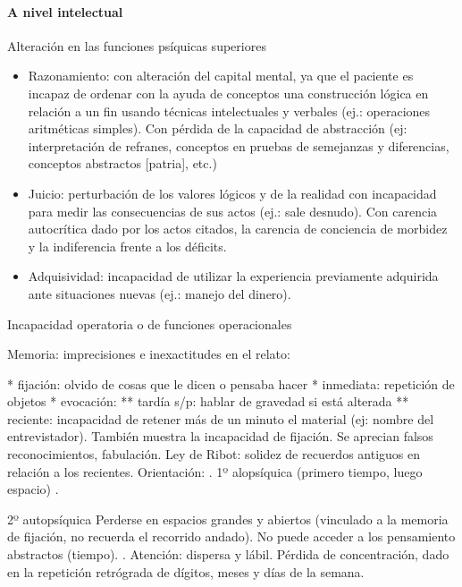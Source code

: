 \paragraph{A nivel intelectual}
Alteración en las funciones psíquicas superiores
\begin{itemize}
	\item Razonamiento: con alteración del capital mental, ya que el paciente es incapaz de ordenar con la ayuda de conceptos una construcción lógica en relación a un fin usando técnicas intelectuales y verbales (ej.: operaciones aritméticas simples). Con pérdida de la capacidad de abstracción (ej: interpretación de refranes, conceptos en pruebas de semejanzas y diferencias, conceptos abstractos [patria], etc.)
	\item Juicio: perturbación de los valores lógicos y de la realidad con incapacidad para medir las consecuencias de sus actos (ej.: sale desnudo). Con carencia autocrítica dado por los actos citados, la carencia de conciencia de morbidez y la indiferencia frente a los déficits.
	\item Adquisividad: incapacidad de utilizar la experiencia previamente adquirida ante situaciones nuevas (ej.: manejo del dinero).
\end{itemize}
Incapacidad operatoria o de funciones operacionales

Memoria: imprecisiones e inexactitudes en el relato:

* fijación: olvido de cosas que le dicen o pensaba hacer
* inmediata: repetición de objetos
* evocación:
** tardía s/p: hablar de gravedad si está alterada
** reciente: incapacidad de retener más de un minuto el material (ej: nombre del entrevistador). También muestra la incapacidad de fijación. Se aprecian falsos reconocimientos, fabulación. Ley de Ribot: solidez de recuerdos antiguos en relación a los recientes. Orientación: . 1º alopsíquica (primero tiempo, luego espacio) .

2º autopsíquica Perderse en espacios grandes y abiertos (vinculado a la memoria de fijación, no recuerda el recorrido andado). No puede acceder a los pensamiento abstractos (tiempo). . Atención: dispersa y lábil. Pérdida de concentración, dado en la repetición retrógrada de dígitos, meses y días de la semana.

